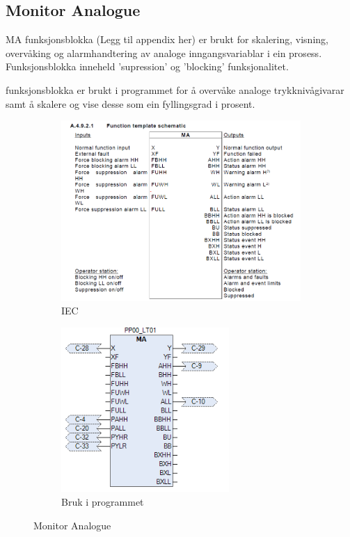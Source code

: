 \subsection{Monitor Analogue}
\gls{MA} funksjonsblokka (Legg til appendix her) er brukt for skalering, visning, overvåking og alarmhandtering av analoge inngangsvariablar i ein prosess.
Funksjonsblokka inneheld 'supression' og 'blocking' funksjonalitet.

funksjonsblokka er brukt i programmet for å overvåke analoge trykknivågivarar samt å skalere og vise desse som ein fyllingsgrad i prosent.

\begin{figure}[htbp]
    \centering
    \begin{subfigure}[b]{0.45\textwidth}
        \centering
        \includegraphics[width=1\textwidth]{Bilder/MABlokkIEC.png}
        \caption{IEC}\label{fig:Monitor Analogue blokk IEC}
    \end{subfigure}
    \hfill
    \begin{subfigure}[b]{0.45\textwidth}
        \centering
        \includegraphics[width=0.7\textwidth]{Bilder/MABlokkIProgrammet.png}
        \caption{Bruk i programmet}\label{fig:Monitor Analogue blokk i programmet}
    \end{subfigure}
    \caption{Monitor Analogue}\label{fig:Monitor Analogue}
\end{figure}
\newpage

